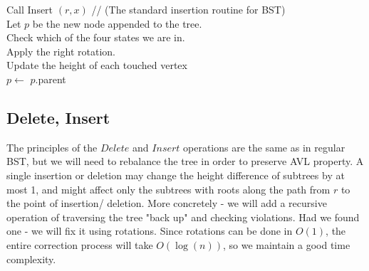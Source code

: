   \begin{algorithm}
    \SetAlgoLined
    Call Insert $(r,x)$   // (The standard insertion routine for BST) \\  
    Let $p$ be the new node appended to the tree. \\
     {
      Check which of the four states we are in.\\ 
      Apply the right rotation. \\ 
      Update the height of each touched vertex  \\
      $p \leftarrow$ $p$.parent \\  
    }
    \caption{ AVL Insert(r,x) } 
  \end{algorithm}


\iffalse
\newpage
\subsection{Delete, Insert}
The principles of the $Delete$ and $Insert$ operations are the same as in
regular BST, but we will need to rebalance the tree in order to preserve AVL
property.
A single insertion or deletion may change the height difference of subtrees
by at most 1, and might affect only the subtrees with roots along the path
from $r$ to the point of insertion/ deletion.
More concretely - we will add a recursive operation of traversing the tree
"back up" and checking violations. Had we found one - we will fix it using
rotations. Since rotations can be done in $O(1)$, the entire correction
process will take $O(\log(n))$, so we maintain a good time complexity.
